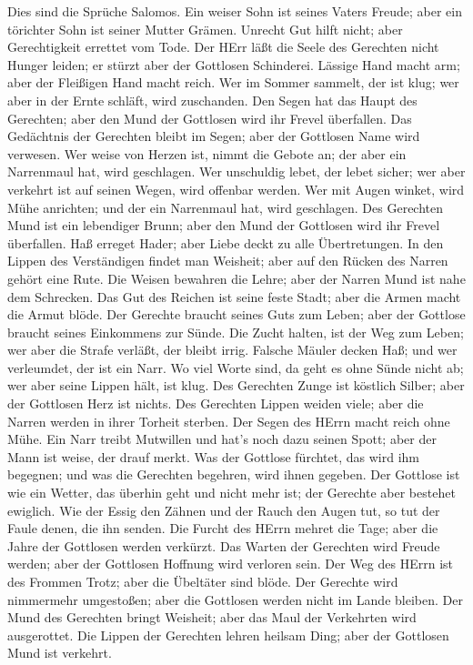  Dies sind die Sprüche Salomos. Ein weiser Sohn ist seines
Vaters Freude; aber ein törichter Sohn ist seiner Mutter Grämen.
 Unrecht Gut hilft nicht; aber Gerechtigkeit errettet vom
Tode.  Der HErr läßt die Seele des Gerechten nicht Hunger
leiden; er stürzt aber der Gottlosen Schinderei.  Lässige
Hand macht arm; aber der Fleißigen Hand macht reich.  Wer im
Sommer sammelt, der ist klug; wer aber in der Ernte schläft, wird
zuschanden.  Den Segen hat das Haupt des Gerechten; aber den
Mund der Gottlosen wird ihr Frevel überfallen.  Das
Gedächtnis der Gerechten bleibt im Segen; aber der Gottlosen Name wird
verwesen.  Wer weise von Herzen ist, nimmt die Gebote an;
der aber ein Narrenmaul hat, wird geschlagen.  Wer
unschuldig lebet, der lebet sicher; wer aber verkehrt ist auf seinen
Wegen, wird offenbar werden.  Wer mit Augen winket, wird
Mühe anrichten; und der ein Narrenmaul hat, wird geschlagen.
 Des Gerechten Mund ist ein lebendiger Brunn; aber den Mund
der Gottlosen wird ihr Frevel überfallen.  Haß erreget
Hader; aber Liebe deckt zu alle Übertretungen.  In den
Lippen des Verständigen findet man Weisheit; aber auf den Rücken des
Narren gehört eine Rute.  Die Weisen bewahren die Lehre;
aber der Narren Mund ist nahe dem Schrecken.  Das Gut des
Reichen ist seine feste Stadt; aber die Armen macht die Armut blöde.
 Der Gerechte braucht seines Guts zum Leben; aber der
Gottlose braucht seines Einkommens zur Sünde.  Die Zucht
halten, ist der Weg zum Leben; wer aber die Strafe verläßt, der bleibt
irrig.  Falsche Mäuler decken Haß; und wer verleumdet, der
ist ein Narr.  Wo viel Worte sind, da geht es ohne Sünde
nicht ab; wer aber seine Lippen hält, ist klug.  Des
Gerechten Zunge ist köstlich Silber; aber der Gottlosen Herz ist nichts.
 Des Gerechten Lippen weiden viele; aber die Narren werden
in ihrer Torheit sterben.  Der Segen des HErrn macht reich
ohne Mühe.  Ein Narr treibt Mutwillen und hat's noch dazu
seinen Spott; aber der Mann ist weise, der drauf merkt. 
Was der Gottlose fürchtet, das wird ihm begegnen; und was die Gerechten
begehren, wird ihnen gegeben.  Der Gottlose ist wie ein
Wetter, das überhin geht und nicht mehr ist; der Gerechte aber bestehet
ewiglich.  Wie der Essig den Zähnen und der Rauch den Augen
tut, so tut der Faule denen, die ihn senden.  Die Furcht
des HErrn mehret die Tage; aber die Jahre der Gottlosen werden verkürzt.
 Das Warten der Gerechten wird Freude werden; aber der
Gottlosen Hoffnung wird verloren sein.  Der Weg des HErrn
ist des Frommen Trotz; aber die Übeltäter sind blöde.  Der
Gerechte wird nimmermehr umgestoßen; aber die Gottlosen werden nicht im
Lande bleiben.  Der Mund des Gerechten bringt Weisheit;
aber das Maul der Verkehrten wird ausgerottet.  Die Lippen
der Gerechten lehren heilsam Ding; aber der Gottlosen Mund ist verkehrt.

